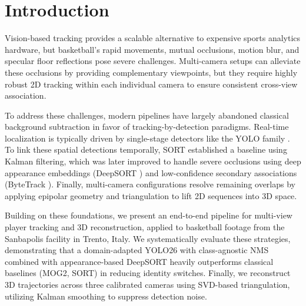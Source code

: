 \section{Introduction}\label{sec:intro}
Vision-based tracking provides a scalable alternative to expensive sports analytics hardware, but basketball's rapid movements, mutual occlusions, motion blur, and specular floor reflections pose severe challenges. 
Multi-camera setups can alleviate these occlusions by providing complementary viewpoints, but they require highly robust 2D tracking within 
each individual camera to ensure consistent cross-view association.

To address these challenges, modern pipelines have largely abandoned classical background subtraction \cite{survey} in favor of tracking-by-detection paradigms. 
Real-time localization is typically driven by single-stage detectors like the YOLO family \cite{yolo_paper, yolo_github}. 
To link these spatial detections temporally, SORT \cite{sort} established a baseline using Kalman filtering, which was later improved to handle 
severe occlusions using deep appearance embeddings (DeepSORT \cite{deepsort, reid}) and low-confidence secondary associations (ByteTrack \cite{bytetrack}). 
Finally, multi-camera configurations \cite{survey} resolve remaining overlaps by applying epipolar geometry and triangulation to lift 2D sequences into 3D space.

Building on these foundations, we present an end-to-end pipeline for multi-view player tracking and 3D reconstruction, applied to basketball footage from the Sanbapolis facility in Trento, Italy. We systematically evaluate these strategies, demonstrating that a domain-adapted YOLO26 with class-agnostic NMS \cite{nms} combined with appearance-based DeepSORT heavily outperforms classical baselines (MOG2, SORT) in reducing identity switches. Finally, we reconstruct 3D trajectories across three calibrated cameras using SVD-based triangulation, utilizing Kalman smoothing to suppress detection noise.
